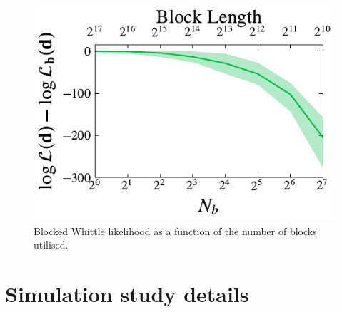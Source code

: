 \documentclass[%
 reprint,
 amsmath,amssymb,
 aps,
 nofootinbib,
]{revtex4-2}
\begin{document}
\begin{figure}[h]
  \includegraphics[width=\columnwidth]{lnl_vs_nchunks}
  \caption{Blocked Whittle likelihood as a function of the number of blocks utilised.}
  \label{fig:lnl_vs_nchunks}
\end{figure}








\section{Simulation study details}




\label{appdx:simstudy}
\end{document}
